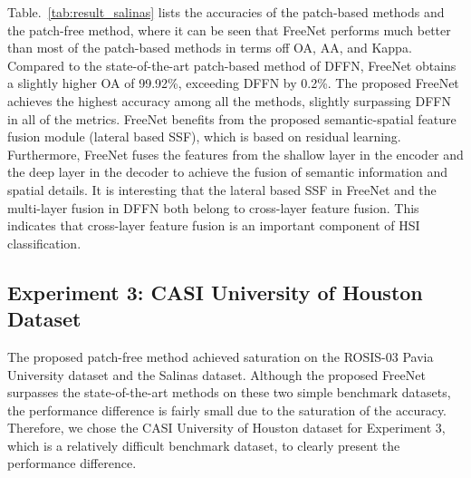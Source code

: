 \documentclass[journal]{IEEEtran}
\begin{document}
Table.~\ref{tab:result_salinas} lists the accuracies of the patch-based methods and the patch-free method, where it can be seen that FreeNet performs much better than most of the patch-based methods in terms off OA, AA, and Kappa.
Compared to the state-of-the-art patch-based method of DFFN, FreeNet obtains a slightly higher OA of 99.92\%, exceeding DFFN by 0.2\%.
The proposed FreeNet achieves the highest accuracy among all the methods, slightly surpassing DFFN in all of the metrics.
FreeNet benefits from the proposed semantic-spatial feature fusion module (lateral based SSF), which is based on residual learning.
Furthermore, FreeNet fuses the features from the shallow layer in the encoder and the deep layer in the decoder to achieve the fusion of semantic information and spatial details.
It is interesting that the lateral based SSF in FreeNet and the multi-layer fusion in DFFN both belong to cross-layer feature fusion.
This indicates that cross-layer feature fusion is an important component of HSI classification.



\subsection{Experiment 3: CASI University of Houston Dataset}
\label{sec:exp2_grss2013}
The proposed  patch-free method achieved saturation on the ROSIS-03 Pavia University dataset and the Salinas dataset.
Although the proposed FreeNet surpasses the state-of-the-art methods on these two simple benchmark datasets, the performance difference is fairly small due to the saturation of the accuracy.
Therefore, we chose the CASI University of Houston dataset for Experiment 3, which is a relatively difficult benchmark dataset, to clearly present the performance difference.
\end{document}
